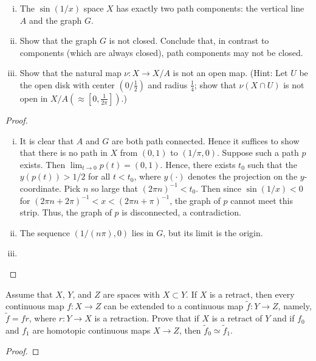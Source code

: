 \documentclass{article}
\begin{document}
\begin{enumerate}[(i)] 
\item The $\sin(1/x)$ space $X$ has exactly two path components: the vertical line $A$ 
and the graph $G$.
\item Show that the graph $G$ is not closed. Conclude that, in contrast to components
(which are always closed), path components may not be closed.
\item Show that the natural map $\nu: X \to X/A$ is not an open map. (Hint: Let $U$
be the open disk with center $(0/\frac 1 2)$ and radius $\frac 1 4$; show that $\nu(X \cap U)$
is not open in $X/A (\approx [0, \frac 1 {2 \pi}])$.)
\end{enumerate}

\begin{proof}
\begin{enumerate}[(i)] 
\item It is clear that $A$ and $G$ are both path connected. Hence it suffices to show that
there is no path in $X$ from $(0,1)$ to $(1/\pi, 0)$. Suppose such a path $p$
exists. Then $\lim_{t \to 0} p(t) = (0,1)$. Hence, there exists $t_0$ such that the $y(p(t)) > 1/2$
for all $t < t_0$, where $y(\cdot)$ denotes the projection on the $y$-coordinate. 
Pick $n$ so large that $(2\pi n)^{-1} < t_0$.  Then since $\sin(1/x) < 0$ for 
$(2\pi n + 2\pi)^{-1} < x < (2\pi n + \pi)^{-1}$, the graph of $p$ cannot meet this strip.
Thus, the graph of $p$ is disconnected, a contradiction.

\item The sequence $(1/(n\pi), 0)$ lies in $G$, but its limit is the origin.

\item %

\end{enumerate}

\end{proof}



 Assume that $X$, $Y$, and $Z$ are spaces with $X \subset Y$. If $X$ is a retract, then 
every continuous map $f: X \to Z$ can be extended to a continuous map $\tilde f : Y \to Z$, 
namely, $\tilde f = fr$, where $r: Y \to X$ is a retraction. Prove that if $X$ is a retract of
$Y$ and if $f_0$ and $f_1$ are homotopic continuous maps $X \to Z$, then $\tilde f_0 \simeq \tilde f_1$.

\begin{proof}

\end{proof}
\end{document}
